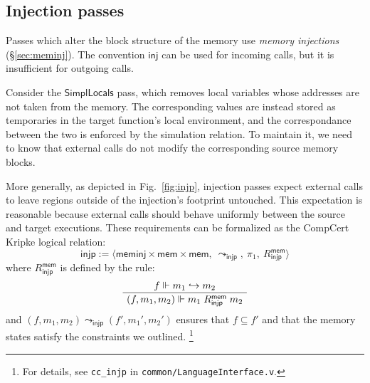 \documentclass[sigplan,10pt,review,anonymous]{acmart}\settopmatter{printfolios=true,printccs=false,printacmref=false}
\newcommand{\kw}[1]{\ensuremath{ \mathsf{#1} }}
\begin{document}

\subsection{Injection passes} \label{sec:pass:inj} %

Passes which alter the block structure of the memory
use \emph{memory injections} (\S\ref{sec:meminj}).
The convention \kw{inj} can be used for incoming calls,
but it is insufficient for outgoing calls.

Consider the \kw{SimplLocals} pass,
which removes local variables whose addresses are not taken
from the memory.
The corresponding values are instead stored
as temporaries in the target function's local environment,
and the correspondance between the two
is enforced by the simulation relation.
To maintain it,
we need to know that
external calls do not modify
the corresponding source memory blocks.

More generally,
as depicted in Fig.~\ref{fig:injp},
injection passes expect external calls
to leave regions outside of the injection's footprint untouched.
This expectation is reasonable because
external calls
should behave uniformly between the source and target executions.
These requirements can be formalized as the
CompCert Kripke logical relation:
\[
  \kw{injp} :=
    \langle
      \kw{meminj} \times \kw{mem} \times \kw{mem}, \:
      {\leadsto_\kw{injp}}, \:
      \pi_1, \:
      R^\kw{mem}_\kw{injp}
    \rangle
\]
where $R^\kw{mem}_\kw{injp}$ is defined by the rule:
\[
  \AxiomC{$f \Vdash m_1 \hookrightarrow m_2$}
  \UnaryInfC{$(f, m_1, m_2) \Vdash m_1 \mathrel{R^\kw{mem}_\kw{injp}} m_2$}
  \DisplayProof
\]
and $(f, m_1, m_2) \leadsto_\kw{injp} (f', m_1', m_2')$
ensures that $f \subseteq f'$ and that the memory states
satisfy the constraints we outlined.%
\footnote{For details,
  see \texttt{cc\_injp} in \texttt{common/LanguageInterface.v}.}
\end{document}
